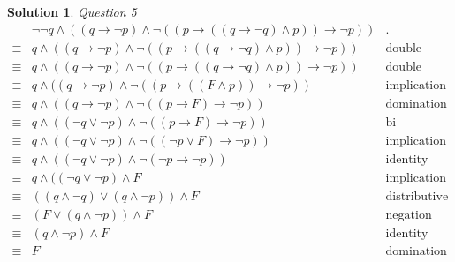\documentclass{article}
\theoremstyle{definition}
\newtheorem*{solution}{Solution}
\begin{document}
\begin{solution}
 \textit{Question 5}
 \begin{align*}
 & \neg \neg q \wedge ((q \to \neg p) \wedge \neg ((p \to ((q \to \neg q) \wedge p)) \to \neg p)) & \text{.}\ \\
 \equiv & q \wedge ((q \to \neg p) \wedge \neg ((p \to ((q \to \neg q) \wedge p)) \to \neg p)) & \text{double negation}\ \\
 \equiv & q \wedge ((q \to \neg p) \wedge \neg ((p \to ((q \to \neg q) \wedge p)) \to \neg p)) & \text{double negation}\ \\
 \equiv & q \wedge ((q \to \neg p) \wedge \neg ((p \to ((F \wedge p)) \to \neg p)) & \text{implication}\ \\ 
 \equiv & q \wedge ((q \to \neg p) \wedge \neg ((p \to F) \to \neg p)) & \text{domination}\ \\ 
 \equiv & q \wedge ((\neg q \vee \neg p) \wedge \neg ((p \to F) \to \neg p)) & \text{bi conditional}\ \\ 
 \equiv & q \wedge ((\neg q \vee \neg p) \wedge \neg ((\neg p \vee F) \to \neg p)) & \text{implication}\ \\
 \equiv & q \wedge ((\neg q \vee \neg p) \wedge \neg (\neg p \to \neg p)) & \text{identity}\ \\
 \equiv & q \wedge ((\neg q \vee \neg p) \wedge F & \text{implication}\ \\
 \equiv & ((q \wedge \neg q) \vee (q \wedge \neg p)) \wedge F & \text{distributive}\ \\
 \equiv & (F \vee (q \wedge \neg p)) \wedge F & \text{negation}\ \\
 \equiv & (q \wedge \neg p) \wedge F & \text{identity}\ \\
 \equiv & F & \text{domination}\ \\
 \end{align*}
 

\end{solution}
\end{document}
